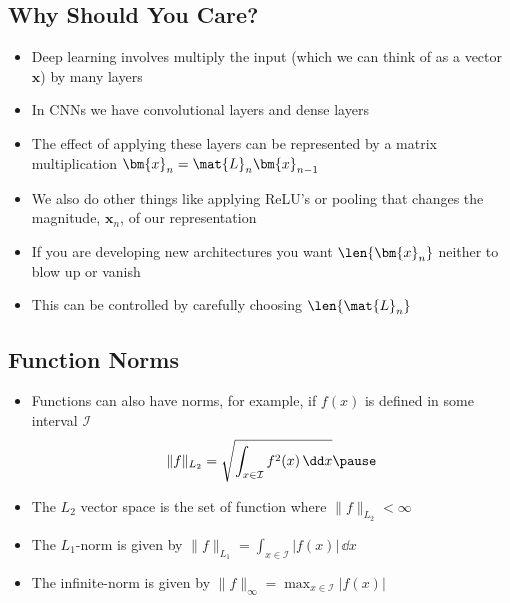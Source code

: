 
\begin{slide}
\section[-2]{Why Should You Care?}

\begin{PauseHighLight}
  \begin{itemize}
  \item Deep learning involves multiply the input (which we can think
    of as a vector $\bm{x}$) by many layers\pause
  \item In CNNs we have convolutional layers and dense layers\pause
  \item The effect of applying these layers can be represented by a
    matrix multiplication $\bm{x}_n = \mat{L}_n \bm{x}_{n-1}$\pause
  \item We also do other things like applying ReLU's or pooling that
    changes the magnitude, $\bm{x}_n$, of our representation\pause
  \item If you are developing new architectures you want
    $\len{\bm{x}_n}$ neither to blow up or vanish\pause
  \item This can be controlled by carefully choosing $\len{\mat{L}_n}$\pause
  \end{itemize}
\end{PauseHighLight}

\end{slide}



\begin{slide}
\section[-1]{Function Norms}

\begin{PauseHighLight}
  \begin{itemize}
  \item Functions can also have norms, for example, if $f(x)$ is defined
    in some interval $\mathcal{I}$ {\small
    \begin{align*}
      \| f \|_{L_2} = \sqrt{\int_{x\in\mathcal{I}} f^2(x) \, \dd x}\pause
    \end{align*}}
  \item The $L_2$ vector space is the set of function where $\|
    f \|_{L_2}<\infty$\pause
  \item The $L_1$-norm is given by
    $\| f \|_{L_1} = \int_{x\in\mathcal{I}} |f(x)| \, \dd x$\pause
  \item The infinite-norm is given by
    $\| f \|_{\infty} = \max_{x\in\mathcal{I}} |f(x)|$\pause
  \end{itemize}
\end{PauseHighLight}

\end{slide}

